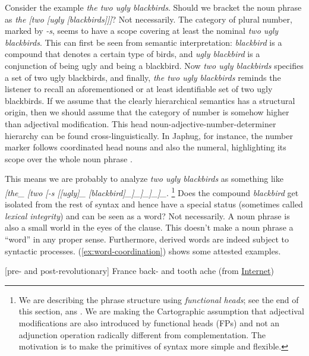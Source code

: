 \documentclass[a4paper, oneside, scheme=plain, 12pt]{article}
\newcommand*{\citepage}[1]{p.~{#1}}
\newcommand*{\term}[1]{\emph{#1}}
\newcommand{\form}[1]{\emph{#1}}
\newcommand{\annotate}[1]{\text{\emph{#1}}}
\begin{document}
Consider the example \form{the two ugly blackbirds}.
Should we bracket the noun phrase as \form{the [two [ugly [blackbirds]]]}?
Not necessarily. The category of plural number, marked by \form{-s}, seems to have a scope covering 
at least the nominal \form{two ugly blackbirds}.
This can first be seen from semantic interpretation:
\form{blackbird} is a compound that denotes a certain type of birds,
and \form{ugly blackbird} is a conjunction of being ugly and being a blackbird.
Now \form{two ugly blackbirds} specifies a set of two ugly blackbirds,
and finally, \form{the two ugly blackbirds} reminds the listener to 
recall an aforementioned or at least identifiable set of two ugly blackbirds.
If we assume that the clearly hierarchical semantics has a structural origin,
then we should assume that the category of number is somehow higher than adjectival modification.
This head noun-adjective-number-determiner hierarchy can be found cross-linguistically.
In Japhug, for instance, the number marker follows coordinated head nouns and also the numeral,
highlighting its scope over the whole noun phrase
\citep[\citepage{368},(2-3)]{jacques2021grammar}.

This means we are probably to analyze \form{two ugly blackbirds} as something like 
\form{[the_{\annotate{D}} [two [-s [[ugly]_{\annotate{AP}} [blackbird]_{\annotate{N}}]_{\annotate{FP}}]_{\annotate{Num'}}]_{\annotate{NumP}}]_{\annotate{DP}}}.%
\footnote{
    We are describing the phrase structure using \term{functional heads};
    see the end of this section, ans .
    We are making the Cartographic assumption that adjectival modifications
    are also introduced by functional heads (FPs) and not an adjunction operation
    radically different from complementation.
    The motivation is to make the primitives of syntax more simple and flexible.
}
Does the compound \form{blackbird} get isolated from the rest of syntax
and hence have a special status (sometimes called \term{lexical integrity})
and can be seen as a word?
Not necessarily. A noun phrase is also a small world in the eyes of the clause.
This doesn't make a noun phrase a ``word'' in any proper sense.
Furthermore, derived words are indeed subject to syntactic processes.
(\ref{ex:word-coordination}) shows some attested examples.

\begin{exe}
    \ex\label{ex:word-coordination}
    \begin{xlist}
        \ex {} [pre- and post-revolutionary] France 
        \ex  back- and tooth ache (from \href{https://web.archive.org/web/20250419153415/https://www.knightpiesold.com/sites/pa/assets/File/Bakubung/App%20D4%20Terrestrial.pdf}{Internet})
    \end{xlist}
\end{exe}
\end{document}
